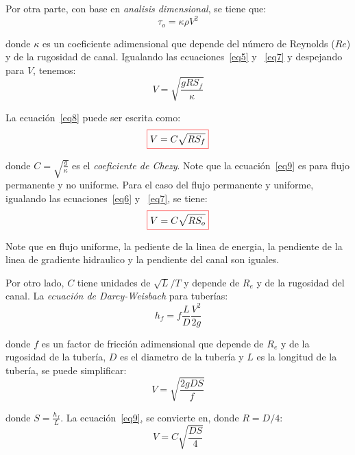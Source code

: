\documentclass[11pt, oneside]{article}
\begin{document}
Por otra parte, con base en \emph{analisis dimensional}, se tiene que:
\begin{equation}
\tau_o = \kappa \rho V^2
\label{eq7}
\end{equation}

donde $\kappa$ es un coeficiente adimensional que depende del n\'umero de Reynolds ($Re$) y de la rugosidad de canal. Igualando las ecuaciones~\ref{eq5} y ~\ref{eq7} y despejando para $V$, tenemos:
\begin{equation}
V = \sqrt{\frac{g R S_f}{\kappa}}
\label{eq8}
\end{equation}

La ecuaci\'on~\ref{eq8} puede ser escrita como:
\begin{equation}
\color{red}\boxed{\color{black} V = C\sqrt{R S_f}}
\label{eq9}
\end{equation}

donde $C = \sqrt{\frac{g}{\kappa}}$ es el  \emph{coeficiente de Chezy}. Note que la ecuaci\'on~\ref{eq9} es para flujo permanente y no uniforme. Para el caso del flujo permanente y uniforme, igualando las ecuaciones~\ref{eq6} y ~\ref{eq7}, se tiene:
\begin{equation}
\color{red}\boxed{\color{black} V = C\sqrt{R S_o}}
\label{eq10}
\end{equation}

Note que en flujo uniforme, la pediente de la linea de energia, la pendiente de la linea de gradiente hidraulico y la pendiente del canal son iguales.

Por otro lado, $C$ tiene unidades de $\sqrt{L}/T$ y depende de $R_e$ y de la rugosidad del canal. La \emph{ecuaci\'on de Darcy-Weisbach} para tuber\'ias:
\begin{equation}
h_f = f\frac{L}{D}\frac{V^2}{2g}
\label{eq11}
\end{equation}

donde $f$ es un factor de fricci\'on adimensional que depende de $R_e$ y de la rugosidad de la tuber\'ia, $D$ es el diametro de la tuber\'ia y $L$ es la longitud de la tuber\'ia, se puede simplificar:
\begin{equation}
V = \sqrt{\frac{2g D S}{f}}
\label{eq12}
\end{equation}

donde $S = \frac{h_f}{L}$. La ecuaci\'on~\ref{eq9}, se convierte en, donde $R=D/4$:
\begin{equation}
V = C\sqrt{\frac{D S}{4}}
\label{eq13}
\end{equation}
\end{document}

